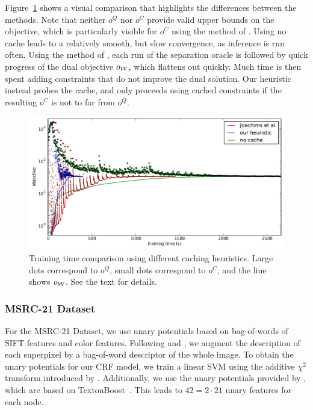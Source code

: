 Figure~\ref{caching} shows a visual comparison that highlights the differences
between the methods. Note that neither $o^Q$ nor $o^C$ provide valid upper bounds on the objective,
which is particularly visible for $o^C$ using the method of \cite{joachims2009cutting}.
Using no cache leads to a relatively smooth, but slow convergence, as inference is run often.
Using the method of \citet{joachims2009cutting}, each run of the separation oracle is followed by
quick progress of the dual objective $o_{\mathcal{W}}$, which flattens out quickly. Much time is then spent adding
constraints that do not improve the dual solution.
Our heuristic instead probes the cache, and only proceeds using cached constraints if the resulting
$o^C$ is not to far from $o^Q$.

\begin{figure}
\centering
\includegraphics[width=\linewidth]{caching}
\caption{%
Training time comparison using different caching heuristics.
Large dots correspond to $o^Q$, small dots correspond to $o^C$,
and the line shows $o_{\mathcal{W}}$. See the text for details.\label{caching}}
\end{figure}


\subsubsection{MSRC-21 Dataset}
For the MSRC-21 Dataset, we use unary potentials based on bag-of-words of SIFT
features and color features.  Following \citet{lucchi2011spatial} and
\citet{fulkerson2009class}, we augment the description of each superpixel by a
bag-of-word descriptor of the whole image. To obtain the unary potentials for
our CRF model, we train a linear SVM using the additive $\chi^2$ transform
introduced by \citet{vedaldi2010efficient}. Additionally, we use the unary
potentials provided by \citet{krahenbuhl2012efficient}, which are based on
TextonBoost~\citep{shotton2006textonboost}. This leads to $42 = 2 \cdot 21$
unary features for each node.


